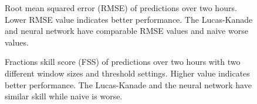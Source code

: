 \begin{figure}[H]
    \centering
    \caption{\label{fig:rmse_loss}Root mean squared error (RMSE) of predictions over two hours.
    Lower RMSE value indicates better performance.
    The Lucas-Kanade and neural network have comparable RMSE values and naive worse values.}
\end{figure}

\begin{figure}[H]
    \centering
    \caption{\label{fig:fss}Fractions skill score (FSS) of predictions over two hours with two different window sizes and threshold settings.
        Higher value indicates better performance.
        The Lucas-Kanade and the neural network have similar skill while naive is worse.}
\end{figure}
